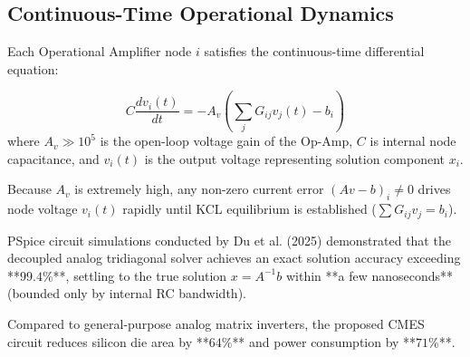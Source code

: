 \subsection{Continuous-Time Operational Dynamics}
Each Operational Amplifier node $i$ satisfies the continuous-time differential equation:

\begin{equation}
C \frac{d v_i(t)}{d t} = - A_v \left( \sum_{j} G_{ij} v_j(t) - b_i \right)
\end{equation}
where $A_v \gg 10^5$ is the open-loop voltage gain of the Op-Amp, $C$ is internal node capacitance, and $v_i(t)$ is the output voltage representing solution component $x_i$.

Because $A_v$ is extremely high, any non-zero current error $(A v - b)_i \neq 0$ drives node voltage $v_i(t)$ rapidly until KCL equilibrium is established ($\sum G_{ij} v_j = b_i$).

\begin{hardwarebox}
PSpice circuit simulations conducted by Du et al. (2025) demonstrated that the decoupled analog tridiagonal solver achieves an exact solution accuracy exceeding **$99.4\%$**, settling to the true solution $x = A^{-1}b$ within **a few nanoseconds** (bounded only by internal RC bandwidth).

Compared to general-purpose analog matrix inverters, the proposed CMES circuit reduces silicon die area by **$64\%$** and power consumption by **$71\%$**.
\end{hardwarebox}

